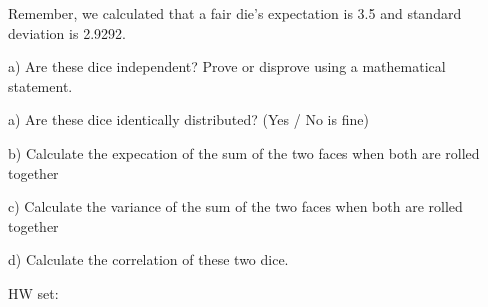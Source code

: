 \documentclass[12pt]{article}
\begin{document}
Remember, we calculated that a fair die's expectation is 3.5 and standard deviation is 2.9292.

a) Are these dice independent? Prove or disprove using a mathematical statement.

a) Are these dice identically distributed? (Yes / No is fine)

b) Calculate the expecation of the sum of the two faces when both are rolled together

c) Calculate the variance of the sum of the two faces when both are rolled together

d) Calculate the correlation of these two dice.


HW set:
\end{document}

